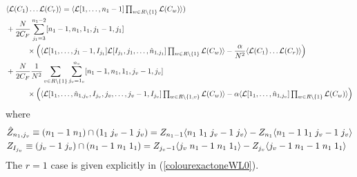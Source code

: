 \documentclass[12pt]{article}
\numberwithin{equation}{section}
\begin{document}
\begin{align}
    &\langle \mathcal{L}(C_1) \hdots \mathcal{L}(C_r)\rangle = \langle \mathcal{L}[1,\ldots,n_1-1] \textstyle\prod_{w\in R\backslash \{1\} }\displaystyle \mathcal{L}(C_w)\rangle) \label{bcfwcolourexact}\\
    & +\frac{N}{2C_F} \sum_{j_1=3}^{n_1-2} [n_1-1,n_1,1_1,j_1-1,j_1] \notag\\
    &\hspace{10mm}\times \Bigl(\langle \mathcal{L}[1_1,\ldots,j_1-1,I_{j_1}]\mathcal{L}[I_{j_1},j_1,\ldots,\hat{n}_{1,j_1}] \textstyle\prod_{w\in R\backslash \{1\}}\displaystyle \mathcal{L}(C_w)\rangle-\frac{\alpha}{N^2}\langle \mathcal{L}(C_1) \hdots \mathcal{L}(C_r)\rangle \Bigr) \notag \\
    &  +\frac{N}{2C_F}\frac{1}{N^2} \sum_{v \in R\backslash\{1\}}\sum_{j_v=1_v}^{n_v} [n_1-1,n_1,1_1,j_v-1,j_v]\notag\\
    &\hspace{10mm}\times\Bigl( \langle \mathcal{L}[1_1,\ldots,\hat{n}_{1,j_v},I_{j_v},j_v,\ldots,j_v-1,I_{j_v}] \textstyle \prod_{w \in R\backslash \{1,v\}} \displaystyle \mathcal{L}(C_w)\rangle- \alpha \langle \mathcal{L}[1_1,\ldots,\hat{n}_{1,j_v}]  \textstyle\prod_{w\in R\backslash \{1\}}\displaystyle \mathcal{L}(C_w)
    \rangle\Bigr) \notag
\end{align}
where
\begin{align}
    &\hat{Z}_{n_1,j_v}\equiv (n_1-1 \hspace{1mm} n_1) \cap (1_1\hspace{1mm} j_v-1 \hspace{1mm} j_v) = Z_{n_1-1}\langle n_1 \hspace{1mm} 1_1\hspace{1mm} j_v-1 \hspace{1mm} j_v\rangle- Z_{n_1}\langle n_1-1 \hspace{1mm} 1_1 \hspace{1mm} j_v -1 \hspace{1mm} j_v\rangle \notag\\
    &Z_{I_{j_v}}\equiv (j_v-1 \hspace{1mm} j_v) \cap (n_1-1 \hspace{1mm} n_1 \hspace{1mm} 1_1) = Z_{j_v-1}\langle j_v \hspace{1mm} n_1-1 \hspace{1mm} n_1 \hspace{1mm} 1_1\rangle- Z_{j_v}\langle j_v-1 \hspace{1mm} n_1-1 \hspace{1mm} n_1 \hspace{1mm} 1_1\rangle 
\end{align}
The $r=1$ case is given explicitly in (\ref{colourexactoneWL0}). 
\end{document}
